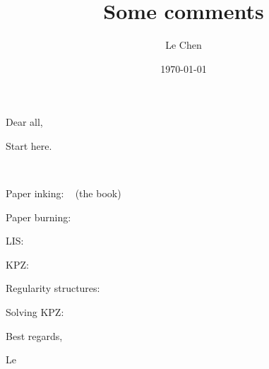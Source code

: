 \documentclass[12pt]{article} %
\title{Some comments}
\author{Le Chen}
\date{\today}
\theoremstyle{plain}
\theoremstyle{definition}
\newcommand{\<}{\langle}
\renewcommand{\>}{\rangle}
\begin{document}
\maketitle
\noindent

Dear all,
\bigskip

Start here.

\cite{family.vicsek:85:scaling}
\cite{kardar.parisi.ea:86:dynamic}
\cite{barabasi.stanley:95:fractal}
\cite{zhang.zhang.ea:92:modeling}
~\cite{takeuchi.sano.ea:11:growing}

Paper inking: ~\cite{barabasi.stanley:95:fractal} (the book)

Paper burning: ~\cite{zhang.zhang.ea:92:modeling}

LIS: ~\cite{baik.deift.ea:99:on}

KPZ: ~\cite{kardar.parisi.ea:86:dynamic}

Regularity structures: ~\cite{hairer:14:theory}

Solving KPZ: ~\cite{hairer:13:solving}


\bigskip
\noindent
Best regards,

\noindent
Le
\begingroup
\global\let\savedifeof=\ifeof
\def\ifeof#1{\global\let\ifeof=\savedifeof\iftrue}%
\printbibliography[title={References}]
\end{document}
